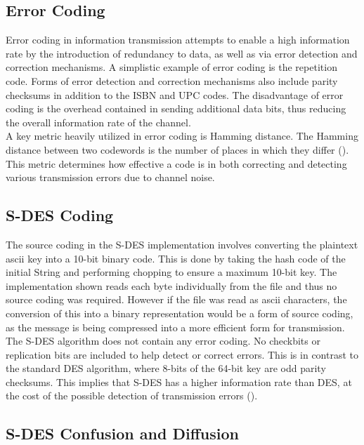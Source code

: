 \documentclass[]{article}
\begin{document}
\subsection*{Error Coding}

Error coding in information transmission attempts to enable a high information rate by the introduction of redundancy to data, as well as via error detection and correction mechanisms. A simplistic example of error coding is the repetition code. Forms of error detection and correction mechanisms also include parity checksums in addition to the ISBN and UPC codes. The disadvantage of error coding is the overhead contained in sending additional data bits, thus reducing the overall information rate of the channel.\\

A key metric heavily utilized in error coding is Hamming distance. The Hamming distance between two codewords is the number of places in which they differ (\cite{lecture}). This metric determines how effective a code is in both correcting and detecting various transmission errors due to channel noise.

\subsection*{S-DES Coding}

The source coding in the S-DES implementation involves converting the plaintext ascii key into a 10-bit binary code. This is done by taking the hash code of the initial String and performing chopping to ensure a maximum 10-bit key. The implementation shown reads each byte individually from the file and thus no source coding was required. However if the file was read as ascii characters, the conversion of this into a binary representation would be a form of source coding, as the message is being compressed into a more efficient form for transmission.\\

The S-DES algorithm does not contain any error coding. No checkbits or replication bits are included to help detect or correct errors. This is in contrast to the standard DES algorithm, where 8-bits of the 64-bit key are odd parity checksums. This implies that S-DES has a higher information rate than DES, at the cost of the possible detection of transmission errors (\cite{alttext}).

\subsection*{S-DES Confusion and Diffusion}
\end{document}
